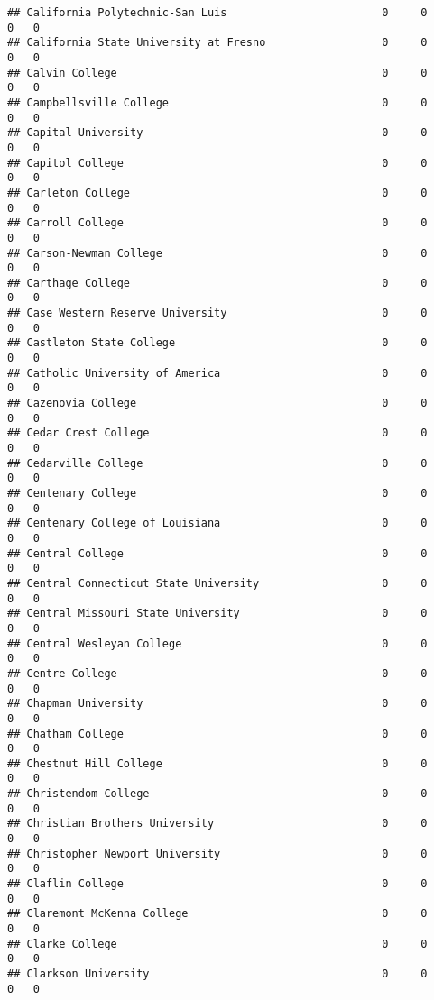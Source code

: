\documentclass[
]{article}
\begin{document}
\begin{verbatim}
## California Polytechnic-San Luis                        0     0        0   0
## California State University at Fresno                  0     0        0   0
## Calvin College                                         0     0        0   0
## Campbellsville College                                 0     0        0   0
## Capital University                                     0     0        0   0
## Capitol College                                        0     0        0   0
## Carleton College                                       0     0        0   0
## Carroll College                                        0     0        0   0
## Carson-Newman College                                  0     0        0   0
## Carthage College                                       0     0        0   0
## Case Western Reserve University                        0     0        0   0
## Castleton State College                                0     0        0   0
## Catholic University of America                         0     0        0   0
## Cazenovia College                                      0     0        0   0
## Cedar Crest College                                    0     0        0   0
## Cedarville College                                     0     0        0   0
## Centenary College                                      0     0        0   0
## Centenary College of Louisiana                         0     0        0   0
## Central College                                        0     0        0   0
## Central Connecticut State University                   0     0        0   0
## Central Missouri State University                      0     0        0   0
## Central Wesleyan College                               0     0        0   0
## Centre College                                         0     0        0   0
## Chapman University                                     0     0        0   0
## Chatham College                                        0     0        0   0
## Chestnut Hill College                                  0     0        0   0
## Christendom College                                    0     0        0   0
## Christian Brothers University                          0     0        0   0
## Christopher Newport University                         0     0        0   0
## Claflin College                                        0     0        0   0
## Claremont McKenna College                              0     0        0   0
## Clarke College                                         0     0        0   0
## Clarkson University                                    0     0        0   0

\end{verbatim}
\end{document}
